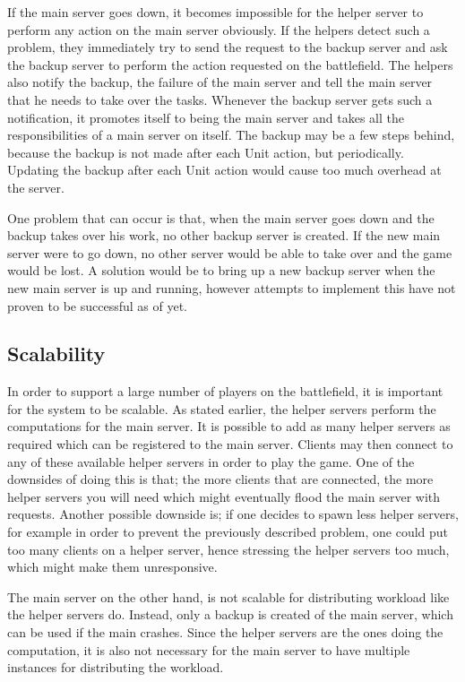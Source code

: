 If the main server goes down, it becomes impossible for the helper server to perform any action on the main server obviously.
If the helpers detect such a problem, they immediately try to send the request to the backup server and ask the backup server to perform the action requested on the battlefield.
The helpers also notify the backup, the failure of the main server and tell the main server that he needs to take over the tasks.
Whenever the backup server gets such a notification, it promotes itself to being the main server and takes all the responsibilities of a main server on itself.
The backup may be a few steps behind, because the backup is not made after each Unit action, but periodically. 
Updating the backup after each Unit action would cause too much overhead at the server. 

One problem that can occur is that, when the main server goes down and the backup takes over his work, no other backup server is created. 
If the new main server were to go down, no other server would be able to take over and the game would be lost. 
A solution would be to bring up a new backup server when the new main server is up and running, however attempts to implement this have not proven to be successful as of yet.

\subsection{Scalability}
In order to support a large number of players on the battlefield, it is important for the system to be scalable.
As stated earlier, the helper servers perform the computations for the main server.
It is possible to add as many helper servers as required which can be registered to the main server.
Clients may then connect to any of these available helper servers in order to play the game. One of the downsides of doing this is that; the more clients that are connected, the more helper servers you will need which might eventually flood the main server with requests. Another possible downside is; if one decides to spawn less helper servers, for example in order to prevent the previously described problem, one could put too many clients on a helper server, hence stressing the helper servers too much, which might make them unresponsive.

The main server on the other hand, is not scalable for distributing workload like the helper servers do. 
Instead, only a backup is created of the main server, which can be used if the main crashes.
Since the helper servers are the ones doing the computation, it is also not necessary for the main server to have multiple instances for distributing the workload.
 
